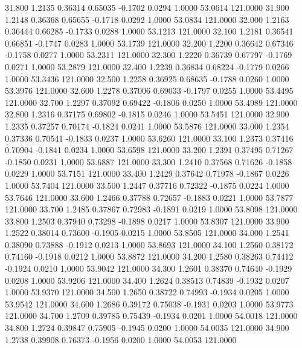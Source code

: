  31.800   1.2135   0.36314   0.65035  -0.1702   0.0294   1.0000  53.0614 121.0000
  31.900   1.2148   0.36368   0.65655  -0.1718   0.0292   1.0000  53.0834 121.0000
  32.000   1.2163   0.36444   0.66285  -0.1733   0.0288   1.0000  53.1213 121.0000
  32.100   1.2181   0.36541   0.66851  -0.1747   0.0283   1.0000  53.1739 121.0000
  32.200   1.2200   0.36642   0.67346  -0.1758   0.0277   1.0000  53.2311 121.0000
  32.300   1.2220   0.36739   0.67797  -0.1769   0.0271   1.0000  53.2879 121.0000
  32.400   1.2239   0.36834   0.68224  -0.1779   0.0266   1.0000  53.3436 121.0000
  32.500   1.2258   0.36925   0.68635  -0.1788   0.0260   1.0000  53.3976 121.0000
  32.600   1.2278   0.37006   0.69033  -0.1797   0.0255   1.0000  53.4495 121.0000
  32.700   1.2297   0.37092   0.69422  -0.1806   0.0250   1.0000  53.4989 121.0000
  32.800   1.2316   0.37175   0.69802  -0.1815   0.0246   1.0000  53.5451 121.0000
  32.900   1.2335   0.37257   0.70174  -0.1824   0.0241   1.0000  53.5876 121.0000
  33.000   1.2354   0.37336   0.70541  -0.1833   0.0237   1.0000  53.6260 121.0000
  33.100   1.2373   0.37416   0.70904  -0.1841   0.0234   1.0000  53.6598 121.0000
  33.200   1.2391   0.37495   0.71267  -0.1850   0.0231   1.0000  53.6887 121.0000
  33.300   1.2410   0.37568   0.71626  -0.1858   0.0229   1.0000  53.7151 121.0000
  33.400   1.2429   0.37642   0.71978  -0.1867   0.0226   1.0000  53.7404 121.0000
  33.500   1.2447   0.37716   0.72322  -0.1875   0.0224   1.0000  53.7646 121.0000
  33.600   1.2466   0.37788   0.72657  -0.1883   0.0221   1.0000  53.7877 121.0000
  33.700   1.2485   0.37867   0.72983  -0.1891   0.0219   1.0000  53.8098 121.0000
  33.800   1.2503   0.37940   0.73298  -0.1898   0.0217   1.0000  53.8307 121.0000
  33.900   1.2522   0.38014   0.73600  -0.1905   0.0215   1.0000  53.8505 121.0000
  34.000   1.2541   0.38090   0.73888  -0.1912   0.0213   1.0000  53.8693 121.0000
  34.100   1.2560   0.38172   0.74160  -0.1918   0.0212   1.0000  53.8872 121.0000
  34.200   1.2580   0.38263   0.74412  -0.1924   0.0210   1.0000  53.9042 121.0000
  34.300   1.2601   0.38370   0.74640  -0.1929   0.0208   1.0000  53.9206 121.0000
  34.400   1.2624   0.38513   0.74839  -0.1932   0.0207   1.0000  53.9370 121.0000
  34.500   1.2650   0.38722   0.74993  -0.1934   0.0205   1.0000  53.9542 121.0000
  34.600   1.2686   0.39172   0.75038  -0.1931   0.0203   1.0000  53.9773 121.0000
  34.700   1.2709   0.39785   0.75439  -0.1934   0.0201   1.0000  54.0018 121.0000
  34.800   1.2724   0.39847   0.75905  -0.1945   0.0200   1.0000  54.0035 121.0000
  34.900   1.2738   0.39908   0.76373  -0.1956   0.0200   1.0000  54.0053 121.0000

